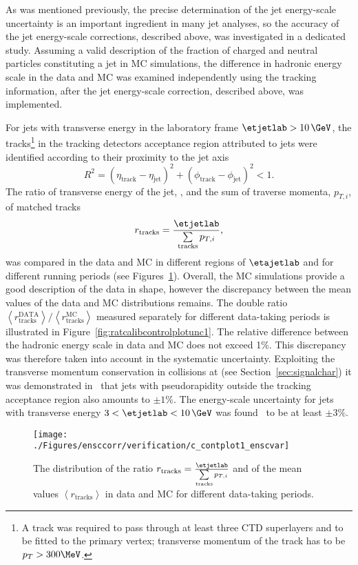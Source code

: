 As  was mentioned previously, the precise determination of the jet energy-scale uncertainty is an important ingredient in many jet analyses, so the accuracy of the jet energy-scale corrections, described above, was investigated in a dedicated study. Assuming a valid description of the fraction of charged and neutral particles constituting a jet in MC simulations, the difference in hadronic energy scale in the data and MC was examined independently using the tracking information, after the jet energy-scale correction, described above, was implemented. 

For jets with transverse energy in the laboratory frame $\etjetlab > 10\,\GeV$, the tracks\footnote{A track was required to pass through at least three CTD superlayers and to be fitted to the primary vertex; transverse momentum of the track has to be $p_T > 300 \MeV$.} in the tracking detectors acceptance region attributed to jets were identified according to their proximity to the jet axis
\begin{equation}
R^2 = \left(\eta_{\mathrm{track}} - \eta_{\mathrm{jet}}\right)^2 + \left(\phi_{\mathrm{track}} - \phi_{\mathrm{jet}}\right)^2 < 1.
\label{eq:rtrackjetcut}
\end{equation}
The ratio of transverse energy of the jet, \etjetlab, and the sum of traverse momenta, $p_{T,i}$, of matched tracks 
\begin{equation}
r_\text{tracks} = \frac{\etjetlab}{\sum\limits_{\text{tracks}}{p_{T,i}}},
\end{equation}
was compared in the data and MC in different regions of $\etajetlab$ and for different running periods (see Figures~\ref{fig:ratcalibcontrolplotunc}). Overall, the MC simulations provide a good description of the data in shape, however the discrepancy between the mean values of the data and MC distributions remains. The double ratio $\left<r_\text{tracks}^\text{DATA}\right>/\left<r_\text{tracks}^\text{MC}\right>$ measured separately for different data-taking periods is illustrated in Figure~\ref{fig:ratcalibcontrolplotunc1}. The relative difference between the hadronic energy scale in data and MC does not exceed 1\%. This discrepancy was therefore taken into account in the systematic uncertainty. Exploiting the transverse momentum conservation in \ep collisions at \hera (see Section~\ref{sec:signalchar}) it was demonstrated in~\cite{thesis:behr:2010,thesis:perrey:2011} that jets with pseudorapidity outside the tracking acceptance region also amounts to $\pm 1\%$. The energy-scale uncertainty for jets with transverse energy $3<\etjetlab<10\,\GeV$ was found~\cite{thesis:behr:2010} to be at least $\pm 3\%$.
\begin{figure}[h!]
	\centering
		\texttt{[image: ./Figures/ensccorr/verification/c\_contplot1\_enscvar]} 
	\caption{The distribution of the ratio $r_\text{tracks} = \frac{\etjetlab}{\sum\limits_{\text{tracks}}{p_{T,i}}}$ and of the mean values $\left\langle r_\text{tracks}\right\rangle$ in data and MC for different data-taking periods.}
	\label{fig:ratcalibcontrolplotunc}
\end{figure}

